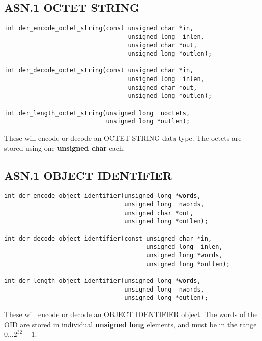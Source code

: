 \documentclass[synpaper]{book}
\begin{document}
\subsection{ASN.1 OCTET STRING}

\begin{verbatim}
int der_encode_octet_string(const unsigned char *in, 
                                  unsigned long  inlen,
                                  unsigned char *out, 
                                  unsigned long *outlen);

int der_decode_octet_string(const unsigned char *in, 
                                  unsigned long  inlen,
                                  unsigned char *out, 
                                  unsigned long *outlen);

int der_length_octet_string(unsigned long  noctets, 
                            unsigned long *outlen);
\end{verbatim}

These will encode or decode an OCTET STRING data type.  The octets are stored using one \textbf{unsigned char} each.  

\subsection{ASN.1 OBJECT IDENTIFIER}

\begin{verbatim}
int der_encode_object_identifier(unsigned long *words, 
                                 unsigned long  nwords,
                                 unsigned char *out, 
                                 unsigned long *outlen);

int der_decode_object_identifier(const unsigned char *in,
                                       unsigned long  inlen,
                                       unsigned long *words, 
                                       unsigned long *outlen);

int der_length_object_identifier(unsigned long *words, 
                                 unsigned long  nwords, 
                                 unsigned long *outlen);
\end{verbatim}

These will encode or decode an OBJECT IDENTIFIER object.  The words of the OID are stored in individual \textbf{unsigned long} elements, and must be in the range
$0 \ldots 2^{32} - 1$.  
\end{document}
